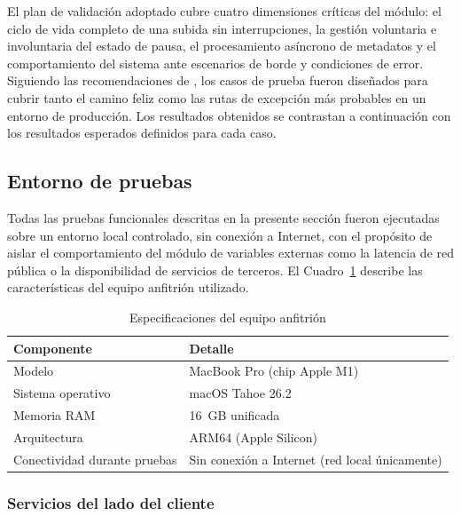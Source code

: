 El plan de validación adoptado cubre cuatro dimensiones críticas del módulo: el ciclo de vida
completo de una subida sin interrupciones, la gestión voluntaria e involuntaria del estado de pausa,
el procesamiento asíncrono de metadatos y el comportamiento del sistema ante escenarios de borde y
condiciones de error. Siguiendo las recomendaciones de \citet{Sommerville2016}, los casos de prueba
fueron diseñados para cubrir tanto el camino feliz como las rutas de excepción más probables en un
entorno de producción. Los resultados obtenidos se contrastan a continuación con los resultados
esperados definidos para cada caso.

\subsection{Entorno de pruebas}
\label{subsec:entorno}

Todas las pruebas funcionales descritas en la presente sección fueron ejecutadas sobre un entorno
local controlado, sin conexión a Internet, con el propósito de aislar el comportamiento del módulo
de variables externas como la latencia de red pública o la disponibilidad de servicios de terceros.
El Cuadro~\ref{tab:entorno_hw} describe las características del equipo anfitrión utilizado.

\begin{table}[htbp]
\centering
\caption{Especificaciones del equipo anfitrión}
\label{tab:entorno_hw}
\begin{tabular}{|l|l|}
\hline
\textbf{Componente}       & \textbf{Detalle} \\
\hline
Modelo                    & MacBook Pro (chip Apple M1) \\
\hline
Sistema operativo         & macOS Tahoe 26.2 \\
\hline
Memoria RAM               & 16~GB unificada \\
\hline
Arquitectura              & ARM64 (Apple Silicon) \\
\hline
Conectividad durante pruebas & Sin conexión a Internet (red local únicamente) \\
\hline
\end{tabular}
\end{table}

\subsubsection*{Servicios del lado del cliente}

